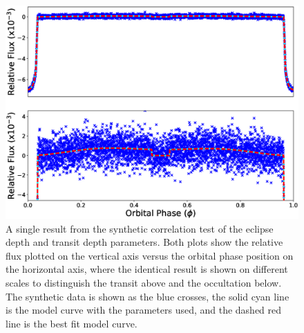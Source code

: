 \documentclass[manuscript]{aastex}
\begin{document}
\begin{figure}

\includegraphics[width=1.0\textwidth]{synthetic_fits_reflect_vary.eps}
\caption{A single result from the synthetic correlation test of the eclipse depth and transit depth parameters. Both plots show the relative flux plotted on the vertical axis versus the orbital phase position on the horizontal axis, where the identical result is shown on different scales to distinguish the transit above and the occultation below. The synthetic data is shown as the blue crosses, the solid cyan line is the model curve with the parameters used, and the dashed red line is the best fit model curve. }

\end{figure}
\end{document}
